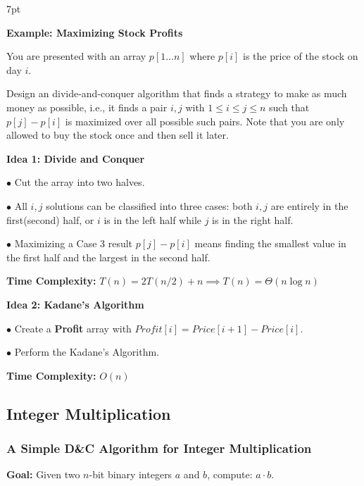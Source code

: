 \documentclass[10pt]{article}
\newenvironment{formal}[2]{%
	\def\FrameCommand{%
		\hspace{1pt}%
		{\color{#1}\vrule width 2pt}%
		{\color{#2}\vrule width 4pt}%
		\colorbox{#2}%
	}%
	\MakeFramed{\advance\hsize-\width\FrameRestore}%
	\noindent\hspace{-4.55pt}%
	\begin{adjustwidth}{}{7pt}%
		\vspace{2pt}\vspace{2pt}%
	}
	{%
		\vspace{2pt}\end{adjustwidth}\endMakeFramed%
}
\begin{document}
\begin{formal}{Brown}{brownshade}
	
	\textbf{Example: Maximizing Stock Profits}
	
	You are presented with an array $p[1\dots n]$ where $p[i]$ is the price of the stock on day $i$.
	
	Design an divide-and-conquer algorithm that finds a strategy to make as much money as possible, i.e., it finds a pair $i, j$ with $1\leq i\leq j\leq n$ such that $p[j]-p[i]$ is maximized over all possible such pairs. Note that you are only allowed to buy the stock once and then sell it later.

\vspace*{1em}

\noindent \textbf{Idea 1: Divide and Conquer}

$\bullet$ Cut the array into two halves.

$\bullet$ All $i, j$ solutions can be classified into three cases: both $i, j$ are entirely in the first(second) half, or $i$ is in the left half while $j$ is in the right half.

$\bullet$ Maximizing a Case 3 result $p[j]-p[i]$ means finding the smallest value in the first half and the largest in the second half.

\textbf{Time Complexity:} $T(n) = 2T(n/2) + n \implies T(n) = \Theta(n\log n)$

\vspace*{1em}

\noindent \textbf{Idea 2: Kadane's Algorithm}

$\bullet$ Create a \textbf{Profit} array with $Profit[i]=Price[i+1]-Price[i]$.

$\bullet$ Perform the Kadane's Algorithm.

\textbf{Time Complexity:} $O(n)$

\end{formal}

\subsection{Integer Multiplication}

\subsubsection{A Simple D\&C Algorithm for Integer Multiplication}

\textbf{Goal:} Given two $n$-bit binary integers $a$ and $b$, compute: $a\cdot b$.
\end{document}
